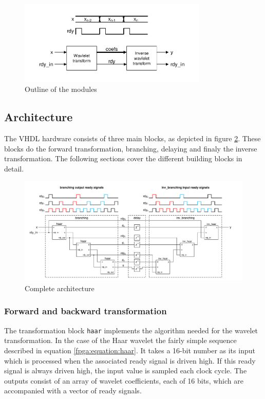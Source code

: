 \begin{refsection}
\begin{figure}
	\centering
	\includegraphics[width=0.8\textwidth]{papers/fpga/images/idea.pdf}
	\caption{Outline of the modules \label{fpga:idea}}
\end{figure}


\subsection{Architecture}
The VHDL hardware consists of three main blocks, as depicted in figure \ref{fpga:fig:architecture}.
These blocks do the forward transformation, branching, delaying and finaly the inverse transformation.
The following sections cover the different building blocks in detail. 
\begin{figure}
	\centering
	\includegraphics[width=\textwidth]{papers/fpga/images/main_delay.pdf}
	\caption{Complete architecture \label{fpga:fig:architecture}}
\end{figure}
\subsubsection{Forward and backward transformation}

The transformation block \texttt{haar} implements the algorithm needed for the wavelet transformation.
In the case of the Haar wavelet the fairly simple sequence described in equation \ref{fpga:equation:haar}.
It takes a 16-bit number as its input which is processed when the associated ready signal is driven high.
If this ready signal is always driven high, the input value is sampled each clock cycle.
The outputs consist of an array of wavelet coefficients, each of 16 bits, which are accompanied with a vector of ready signals. 


\end{refsection}
